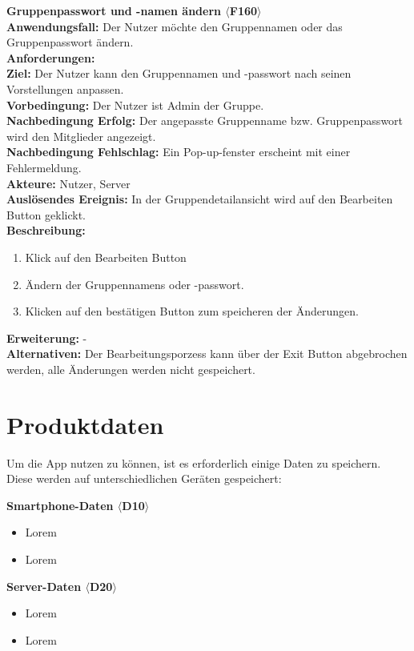 \documentclass[parskip=full]{scrartcl}
\begin{document}
\textbf{Gruppenpasswort und -namen ändern $\langle$F160$\rangle$}\\
\textbf{Anwendungsfall:} Der Nutzer möchte den Gruppennamen oder das Gruppenpasswort ändern.\\
\textbf{Anforderungen:} \\
\textbf{Ziel:} Der Nutzer kann den Gruppennamen und -passwort nach seinen Vorstellungen anpassen.\\
\textbf{Vorbedingung:} Der Nutzer ist Admin der Gruppe.\\
\textbf{Nachbedingung Erfolg:} Der angepasste Gruppenname bzw. Gruppenpasswort wird den Mitglieder angezeigt.\\
\textbf{Nachbedingung Fehlschlag:} Ein Pop-up-fenster erscheint mit einer Fehlermeldung.\\
\textbf{Akteure:} Nutzer, Server \\
\textbf{Auslösendes Ereignis:} In der Gruppendetailansicht wird auf den Bearbeiten Button geklickt.\\
\textbf{Beschreibung:}
\begin{enumerate}
    \item Klick auf den Bearbeiten Button
    \item Ändern der Gruppennamens oder -passwort.
    \item Klicken auf den bestätigen Button zum speicheren der Änderungen.
\end{enumerate}
\textbf{Erweiterung:} -\\
\textbf{Alternativen:} Der Bearbeitungsporzess kann über der Exit Button abgebrochen werden, alle Änderungen werden nicht gespeichert.\\
\newpage


\section{Produktdaten}
Um die App nutzen zu können, ist es erforderlich einige Daten zu speichern. Diese werden auf unterschiedlichen Geräten gespeichert:

\textbf{Smartphone-Daten $\langle$D10$\rangle$}
\begin{itemize}
    \item Lorem
    \item Lorem
\end{itemize}

\textbf{Server-Daten $\langle$D20$\rangle$}
\begin{itemize}
    \item Lorem
    \item Lorem
\end{itemize}
\end{document}
